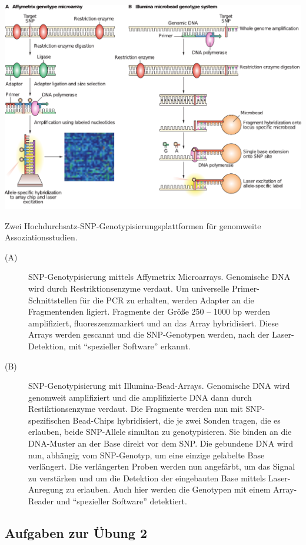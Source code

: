 \includegraphics[width=1\textwidth]{lectures/V2/pix/snp_arrays.pdf}

Zwei Hochdurchsatz-SNP-Genotypisierungsplattformen für genomweite Assoziationsstudien.

\begin{description}
    \item[(A)] SNP-Genotypisierung mittels Affymetrix Microarrays. Genomische DNA wird durch Restriktionsenzyme verdaut. 
        Um universelle Primer-Schnittstellen für die PCR zu erhalten, werden Adapter an die Fragmentenden ligiert. 
        Fragmente der Größe 250 – 1000 bp werden amplifiziert, fluoreszenzmarkiert und an das Array hybridisiert. 
        Diese Arrays werden gescannt und die SNP-Genotypen werden, nach der Laser-Detektion, mit ``spezieller Software'' erkannt.
    \item[(B)] SNP-Genotypisierung mit Illumina-Bead-Arrays. Genomische DNA wird genomweit amplifiziert und die amplifizierte DNA dann durch Restiktionsenzyme verdaut. 
        Die Fragmente werden nun mit SNP-spezifischen Bead-Chips hybridisiert, die je zwei Sonden tragen, die es erlauben, beide SNP-Allele simultan zu genotypisieren. 
        Sie binden an die DNA-Muster an der Base direkt vor dem SNP.
        Die gebundene DNA wird nun, abhängig vom SNP-Genotyp, um eine einzige gelabelte Base verlängert.
        Die verlängerten Proben werden nun angefärbt, um das Signal zu verstärken und um die Detektion der eingebauten Base mittels Laser-Anregung zu erlauben. 
        Auch hier werden die Genotypen mit einem Array-Reader und ``spezieller Software'' detektiert.
\end{description}

\subsection{Aufgaben zur Übung 2}
